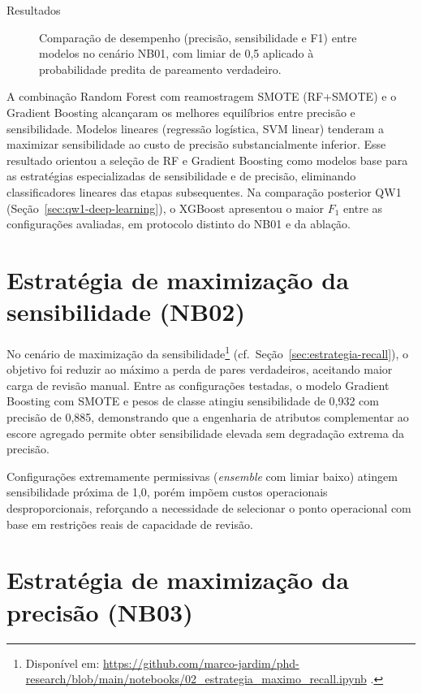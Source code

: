 \begin{chapter}{Resultados}
\begin{figure}[!ht]
\centering
\resizebox{\textwidth}{!}{}
\caption{Comparação de desempenho (precisão, sensibilidade e F1) entre modelos no cenário NB01, com limiar de 0,5 aplicado à probabilidade predita de pareamento verdadeiro.}
\label{fig:nb01-model-comparison}
\end{figure}

A combinação Random Forest com reamostragem SMOTE (RF+SMOTE) e o Gradient Boosting alcançaram os melhores equilíbrios entre precisão e sensibilidade. Modelos lineares (regressão logística, SVM linear) tenderam a maximizar sensibilidade ao custo de precisão substancialmente inferior. Esse resultado orientou a seleção de RF e Gradient Boosting como modelos base para as estratégias especializadas de sensibilidade e de precisão, eliminando classificadores lineares das etapas subsequentes. Na comparação posterior QW1 (Seção~\ref{sec:qw1-deep-learning}), o XGBoost apresentou o maior $F_1$ entre as configurações avaliadas, em protocolo distinto do NB01 e da ablação.

\section{Estratégia de maximização da sensibilidade (NB02)}
\label{sec:cap5-nb02}

No cenário de maximização da sensibilidade\footnote{Disponível em: \url{https://github.com/marco-jardim/phd-research/blob/main/notebooks/02_estrategia_maximo_recall.ipynb} \cite{Jardim2026phdrepo}.} (cf.\ Seção~\ref{sec:estrategia-recall}), o objetivo foi reduzir ao máximo a perda de pares verdadeiros, aceitando maior carga de revisão manual. Entre as configurações testadas, o modelo Gradient Boosting com SMOTE e pesos de classe atingiu sensibilidade de 0,932 com precisão de 0,885, demonstrando que a engenharia de atributos complementar ao escore agregado permite obter sensibilidade elevada sem degradação extrema da precisão.

Configurações extremamente permissivas (\textit{ensemble} com limiar baixo) atingem sensibilidade próxima de 1,0, porém impõem custos operacionais desproporcionais, reforçando a necessidade de selecionar o ponto operacional com base em restrições reais de capacidade de revisão.

\section{Estratégia de maximização da precisão (NB03)}
\label{sec:cap5-nb03}


\end{chapter}
